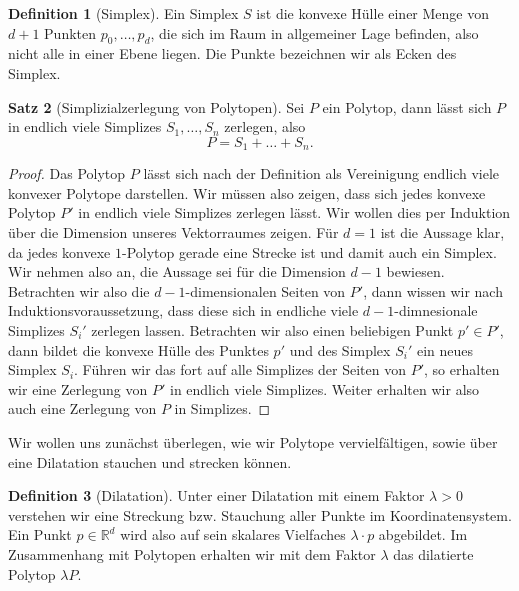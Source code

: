 \documentclass[11pt,titlepage]{article}
\newcommand{\setR}{\mathbb{R}}
\theoremstyle{definition}
\newtheorem{theorem}{Satz}[section]
\newtheorem{definition}[theorem]{Definition}
\theoremstyle{remark}
\begin{document}
	\begin{definition}[Simplex]
		Ein Simplex $S$ ist die konvexe Hülle einer Menge von $d+1$ Punkten 
		$p_0,\ldots,p_d$, die sich im Raum in allgemeiner Lage befinden, also 
		nicht alle in einer Ebene liegen. Die Punkte bezeichnen wir als 
		Ecken des Simplex.
	\end{definition}
	
	\begin{theorem}[Simplizialzerlegung von Polytopen]\label{thm:simplzerl}
		Sei $P$ ein Polytop, dann lässt sich $P$ in endlich viele 
		Simplizes $S_1,\ldots,S_n$ zerlegen, also
		\[P=S_1+\ldots+S_n.\]
	\end{theorem}
	
	\begin{proof}
		Das Polytop $P$ lässt sich nach der Definition als Vereinigung endlich 
		viele konvexer Polytope darstellen. Wir müssen also 
		zeigen, dass sich jedes konvexe Polytop $P'$ in endlich viele Simplizes 
		zerlegen lässt. Wir wollen dies per Induktion über die Dimension 
		unseres Vektorraumes zeigen. Für $d=1$ ist die Aussage klar, da 
		jedes konvexe $1$-Polytop gerade eine Strecke ist und damit auch ein 
		Simplex. Wir nehmen also an, die Aussage sei für die Dimension $d-1$ 
		bewiesen. Betrachten wir also die $d-1$-dimensionalen Seiten von 
		$P'$, dann wissen wir nach Induktionsvoraussetzung, dass diese 
		sich in endliche viele $d-1$-dimnesionale Simplizes $S_i'$ zerlegen lassen. 
		Betrachten wir also einen beliebigen Punkt $p'\in P'$, dann 
		bildet die konvexe Hülle des Punktes $p'$ und des Simplex $S_i'$ ein 
		neues Simplex $S_i$. Führen wir das fort auf alle Simplizes der Seiten 
		von $P'$, so erhalten wir eine Zerlegung von $P'$ in endlich viele 
		Simplizes. Weiter erhalten wir also auch eine Zerlegung von 
		$P$ in Simplizes.
	\end{proof}
	
	Wir wollen uns zunächst überlegen, wie wir Polytope vervielfältigen, sowie 
	über eine Dilatation stauchen und strecken können. 
	
	\begin{definition}[Dilatation]
		Unter einer Dilatation mit einem Faktor $\lambda>0$ 
		verstehen wir eine Streckung bzw. Stauchung aller Punkte 
		im Koordinatensystem. Ein Punkt $p\in\setR^d$ wird also auf 
		sein skalares Vielfaches $\lambda\cdot p$ abgebildet. Im Zusammenhang mit 
		Polytopen erhalten wir mit dem Faktor $\lambda$ das dilatierte Polytop 
		$\lambda P$.
	\end{definition}
	
\end{document}
